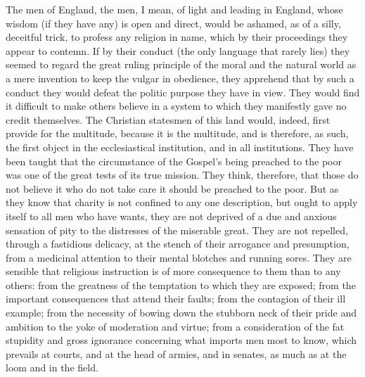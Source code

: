 The men of England, the men, I mean, of light and leading in England, whose wisdom (if they have any) is open and direct, would be ashamed, as of a silly, deceitful trick, to profess any religion in name, which by their proceedings they appear to contemn. If by their conduct (the only language that rarely lies) they seemed to regard the great ruling principle of the moral and the natural world as a mere invention to keep the vulgar in obedience, they apprehend that by such a conduct they would defeat the politic purpose they have in view. They would find it difficult to make others believe in a system to which they manifestly gave no credit themselves. The Christian statesmen of this land would, indeed, first provide for the multitude, because it is the multitude, and is therefore, as such, the first object in the ecclesiastical institution, and in all institutions. They have been taught that the circumstance of the Gospel's being preached to the poor was one of the great tests of its true mission. They think, therefore, that those do not believe it who do not take care it should be preached to the poor. But as they know that charity is not confined to any one description, but ought to apply itself to all men who have wants, they are not deprived of a due and anxious sensation of pity to the distresses of the miserable great. They are not repelled, through a fastidious delicacy, at the stench of their arrogance and presumption, from a medicinal attention to their mental blotches and running sores. They are sensible that religious instruction is of more consequence to them than to any others: from the greatness of the temptation to which they are exposed; from the important consequences that attend their faults; from the contagion of their ill example; from the necessity of bowing down the stubborn neck of their pride and ambition to the yoke of moderation and virtue; from a consideration of the fat stupidity and gross ignorance concerning what imports men most to know, which prevails at courts, and at the head of armies, and in senates, as much as at the loom and in the field.

